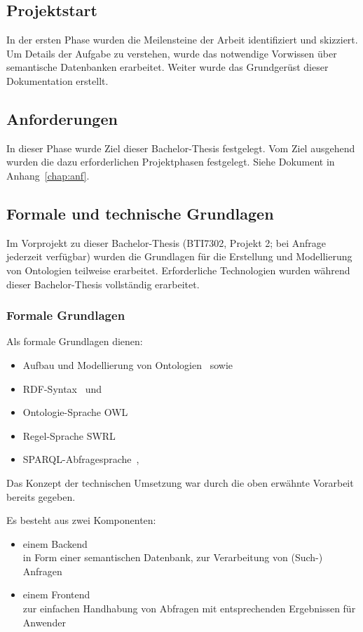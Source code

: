 \subsection{Projektstart}
\label{subsec:projektstart}
In der ersten Phase wurden die Meilensteine der Arbeit identifiziert und skizziert. Um Details der Aufgabe zu verstehen, wurde das notwendige Vorwissen über semantische Datenbanken erarbeitet. Weiter wurde das Grundgerüst dieser Dokumentation erstellt.

\subsection{Anforderungen}
\label{subsec:anforderungen}
In dieser Phase wurde Ziel dieser Bachelor-Thesis festgelegt. Vom Ziel ausgehend wurden die dazu erforderlichen Projektphasen festgelegt. Siehe Dokument in Anhang~\ref{chap:anf}.

\subsection{Formale und technische Grundlagen}
\label{sub:formale_und_technische_grundlagen}
Im Vorprojekt zu dieser Bachelor-Thesis (BTI7302, Projekt 2; bei Anfrage jederzeit verfügbar) wurden die Grundlagen für die Erstellung und Modellierung von Ontologien teilweise erarbeitet. Erforderliche Technologien wurden während dieser Bachelor-Thesis vollständig erarbeitet.

\subsubsection{Formale Grundlagen}
Als formale Grundlagen dienen:
\begin{itemize}
    \item Aufbau und Modellierung von Ontologien~\citep{IspekOntoBedeutung} sowie~\citep{ISpekOntoGeschichte}
    \item RDF-Syntax~\citep{w3rdf} und~\citep{w3rdf_syntax}
    \item Ontologie-Sprache OWL~\citep{w3owl}
    \item Regel-Sprache SWRL~\citep{swrl}
    \item SPARQL-Abfragesprache~\citep{w3sparql_querylang},~\citep{w3sparql_overview}
\end{itemize}

Das Konzept der technischen Umsetzung war durch die oben erwähnte Vorarbeit bereits gegeben.

Es besteht aus zwei Komponenten:
\begin{itemize}
    \item einem Backend\\
        in Form einer semantischen Datenbank, zur Verarbeitung von (Such-) Anfragen
    \item einem Frontend\\
        zur einfachen Handhabung von Abfragen mit entsprechenden Ergebnissen für Anwender
\end{itemize}

